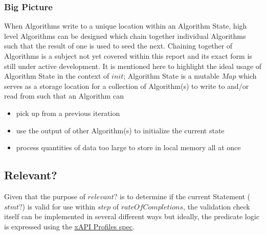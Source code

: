 \documentclass[../main.tex]{subfiles}
\begin{document}
\subsubsection{Big Picture}
When Algorithms write to a unique location within an Algorithm State, high level Algorithms can be designed which
chain together individual Algorithms such that the result of one is used to seed the next. Chaining together of Algorithms
is a subject not yet covered within this report and its exact form is still under active development. It is mentioned here
to highlight the ideal usage of Algorithm State in the context of $init$; Algorithm State is a mutable $Map$ which
serves as a storage location for a collection of Algorithm(s) to write to and/or read from such that an Algorithm
can
\begin{itemize}
\item pick up from a previous iteration
\item use the output of other Algorithm(s) to initialize the current state
\item process quantities of data too large to store in local memory all at once
\end{itemize}

\subsection{Relevant?}
Given that the purpose of $relevant?$ is to determine if the current Statement ($stmt?$)
is valid for use within $step$ of $rateOfCompletions$, the validation check itself can
be implemented in several different ways but ideally, the predicate logic is expressed using the
\href{https://github.com/adlnet/xapi-profiles/blob/master/xapi-profiles-about.md}{xAPI Profiles spec}.
\end{document}
